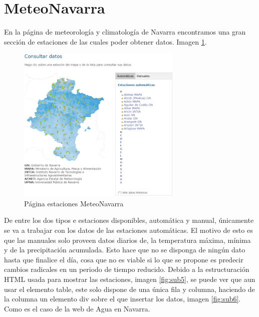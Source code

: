 \section{MeteoNavarra}
En la página de meteorología y climatología de Navarra encontramos una gran sección de estaciones de las cuales poder obtener datos. Imagen \ref{fig:ej27}.

\begin{figure} [H]
	\centering
	\includegraphics[width=0.7\textwidth]{fig/MeteoNavarraCode.png}
	\caption[Página estaciones MeteoNavarra]{Página estaciones MeteoNavarra}
	\label{fig:ej27}
\end{figure}

De entre los dos tipos e estaciones disponibles, automática y manual, únicamente se va a trabajar con los datos de las estaciones automáticas. El motivo de esto es que las manuales solo proveen datos diarios de, la temperatura máxima, mínima y de la precipitación acumulada. Esto hace que no se disponga de ningún dato hasta que finalice el día, cosa que no es viable si lo que se propone es predecir cambios radicales en un periodo de tiempo reducido.
\newline
\newline
Debido a la estructuración HTML usada para mostrar las estaciones, imagen \ref{fig:sub5}, se puede ver que aun usar el elemento table, este solo dispone de una única fila y columna, haciendo de la columna un elemento div sobre el que insertar los datos, imagen \ref{fig:sub6}. Como es el caso de la web de Agua en Navarra.

